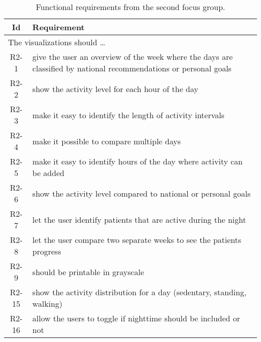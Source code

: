 \begin{table}[h!]
  \begin{center}
  \begin{tabular}{|c|p{12cm}|}
    \hline
      \textbf{Id} & \textbf{Requirement} \\ \hline
    \multicolumn{2}{|l|}{The visualizations should \ldots} \\ \hline
      R2-1 & give the user an overview of the week where the days are classified by national recommendations or personal goals \\ \hline
      R2-2 & show the activity level for each hour of the day \\ \hline
      R2-3 & make it easy to identify the length of activity intervals \\ \hline
      R2-4 & make it possible to compare multiple days \\ \hline
      R2-5 & make it easy to identify hours of the day where activity can be added \\ \hline
      R2-6 & show the activity level compared to national or personal goals \\ \hline
      R2-7 & let the user identify patients that are active during the night \\ \hline
      R2-8 & let the user compare two separate weeks to see the patients progress \\ \hline
      R2-9 & should be printable in grayscale \\ \hline
      R2-15 & show the activity distribution for a day (sedentary, standing, walking) \\ \hline
      R2-16 & allow the users to toggle if nighttime should be included or not \\ \hline
  \end{tabular}
  \end{center}
  \caption[Final functional requirements]{Functional requirements from the second focus group.}
  \label{tab:f2ReqCon}
\end{table}

